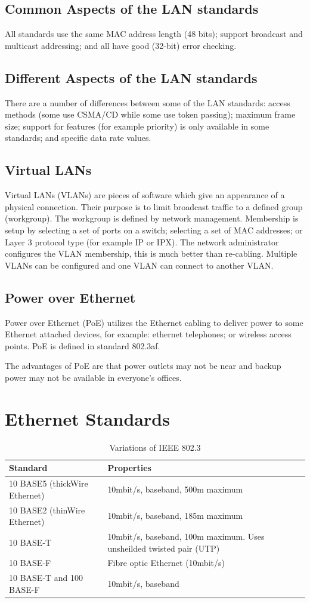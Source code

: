 \subsection*{Common Aspects of the LAN standards}
All standards use the same MAC address length (48 bits); support broadcast and multicast addressing; and all have good (32-bit) error checking.
\subsection*{Different Aspects of the LAN standards}
There are a number of differences between some of the LAN standards: access methods (some use CSMA/CD while some use token passing); maximum frame size; support for features (for example priority) is only available in some standards; and specific data rate values.
\subsection*{Virtual LANs}
Virtual LANs (VLANs) are pieces of software which give an appearance of a physical connection. Their purpose is to limit broadcast traffic to a defined group (workgroup). The workgroup is defined by network management. Membership is setup by selecting a set of ports on a switch; selecting a set of MAC addresses; or Layer 3 protocol type (for example IP or IPX). The network administrator configures the VLAN membership, this is much better than re-cabling. Multiple VLANs can be configured and one VLAN can connect to another VLAN.
\subsection*{Power over Ethernet}
Power over Ethernet (PoE) utilizes the Ethernet cabling to deliver power to some Ethernet attached devices, for example: ethernet telephones; or wireless access points. PoE is defined in standard 802.3af.

The advantages of PoE are that power outlets may not be near and backup power may not be available in everyone's offices.

\section*{Ethernet Standards}
\begin{table}[H]
    \centering
    \begin{tabularx}{0.9\textwidth}{X|X}
        Standard & Properties\\
        \hline
        10 BASE5 (thickWire Ethernet) & 10mbit/s, baseband, 500m maximum\\
        10 BASE2 (thinWire Ethernet) & 10mbit/s, baseband, 185m maximum\\
        10 BASE-T & 10mbit/s, baseband, 100m maximum. Uses unsheilded twisted pair (UTP)\\
        10 BASE-F & Fibre optic Ethernet (10mbit/s)\\
        10 BASE-T and 100 BASE-F & 10mbit/s, baseband\\        
    \end{tabularx}
    \caption{Variations of IEEE 802.3}
\end{table}


